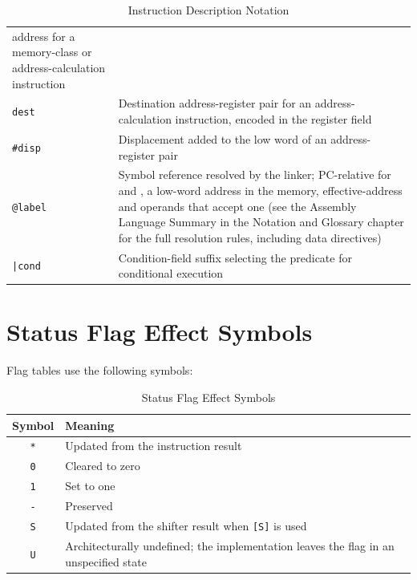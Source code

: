 \begin{table}[H]
\begin{tabular}{lp{10cm}}
		address for a memory-class or address-calculation instruction                                                                      \\
		\texttt{dest}       & Destination address-register pair for an address-calculation instruction, encoded in the
		register field                                                                                                                     \\
		\texttt{\#disp}     & Displacement added to the low word of an address-register pair                                               \\
		\texttt{@label}     & Symbol reference resolved by the linker; PC-relative for \mnemonic{BRAN} and
		\mnemonic{BRSR}, a low-word address in the memory, effective-address and \mnemonic{MOVI} operands that accept one (see the Assembly Language Summary in the Notation and
		Glossary chapter for the full resolution rules, including data directives)                                                         \\
		\texttt{|cond}      & Condition-field suffix selecting the predicate for conditional execution                                     \\
		\bottomrule
	\end{tabular}
	\caption{Instruction Description Notation}
	\label{tab:instruction-description-notation}
\end{table}

\section{Status Flag Effect Symbols}
\label{sec:flag-effect-symbols}

Flag tables use the following symbols:

\begin{table}[H]
	\centering
	\begin{tabular}{cp{9cm}}
		\toprule
		\textbf{Symbol} & \textbf{Meaning}                                                                      \\
		\midrule
		\texttt{*}      & Updated from the instruction result                                                   \\
		\texttt{0}      & Cleared to zero                                                                       \\
		\texttt{1}      & Set to one                                                                            \\
		\texttt{-}      & Preserved                                                                             \\
		\texttt{S}      & Updated from the shifter result when \texttt{[S]} is used                             \\
		\texttt{U}      & Architecturally undefined; the implementation leaves the flag in an unspecified state \\
		\bottomrule
	\end{tabular}
	\caption{Status Flag Effect Symbols}
	\label{tab:flag-effect-symbols}
\end{table}

